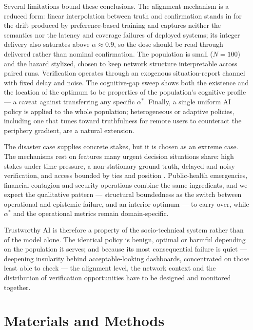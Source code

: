 \documentclass[pdflatex,sn-nature]{sn-jnl}
\begin{document}
Several limitations bound these conclusions. The alignment mechanism is a reduced form: linear interpolation between truth and confirmation stands in for the drift produced by preference-based training \citep{sharma2024sycophancy} and captures neither the semantics nor the latency and coverage failures of deployed systems; its integer delivery also saturates above $\alpha \approx 0.9$, so the dose should be read through delivered rather than nominal confirmation. The population is small ($N = 100$) and the hazard stylized, chosen to keep network structure interpretable across paired runs. Verification operates through an exogenous situation-report channel with fixed delay and noise. The cognitive-gap sweep shows both the existence and the location of the optimum to be properties of the population's cognitive profile --- a caveat against transferring any specific $\alpha^{*}$. Finally, a single uniform AI policy is applied to the whole population; heterogeneous or adaptive policies, including one that tunes toward truthfulness for remote users to counteract the periphery gradient, are a natural extension.

The disaster case supplies concrete stakes, but it is chosen as an extreme case. The mechanisms rest on features many urgent decision situations share: high stakes under time pressure, a non-stationary ground truth, delayed and noisy verification, and access bounded by ties and position \citep{svenson1993time,mendonca2001decision,holguin2012unique}. Public-health emergencies, financial contagion and security operations combine the same ingredients, and we expect the qualitative pattern --- structural boundedness as the switch between operational and epistemic failure, and an interior optimum --- to carry over, while $\alpha^{*}$ and the operational metrics remain domain-specific.

Trustworthy AI is therefore a property of the socio-technical system rather than of the model alone. The identical policy is benign, optimal or harmful depending on the population it serves; and because its most consequential failure is quiet --- deepening insularity behind acceptable-looking dashboards, concentrated on those least able to check --- the alignment level, the network context and the distribution of verification opportunities have to be designed and monitored together.

\section{Materials and Methods}\label{sec:methods}
\end{document}
